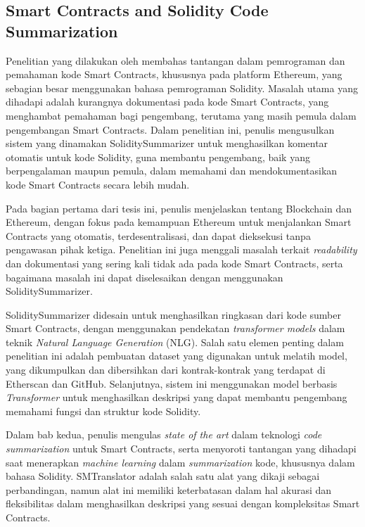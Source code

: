 \subsection{Smart Contracts and Solidity Code Summarization}
\label{subsec:smart-contract-solidity-summary}

Penelitian yang dilakukan oleh \cite{zhang2021smart} membahas tantangan dalam pemrograman dan pemahaman kode Smart Contracts, khususnya pada platform Ethereum, yang sebagian besar menggunakan bahasa pemrograman Solidity. Masalah utama yang dihadapi adalah kurangnya dokumentasi pada kode Smart Contracts, yang menghambat pemahaman bagi pengembang, terutama yang masih pemula dalam pengembangan Smart Contracts. Dalam penelitian ini, penulis mengusulkan sistem yang dinamakan SoliditySummarizer untuk menghasilkan komentar otomatis untuk kode Solidity, guna membantu pengembang, baik yang berpengalaman maupun pemula, dalam memahami dan mendokumentasikan kode Smart Contracts secara lebih mudah.

Pada bagian pertama dari tesis ini, penulis menjelaskan tentang Blockchain dan Ethereum, dengan fokus pada kemampuan Ethereum untuk menjalankan Smart Contracts yang otomatis, terdesentralisasi, dan dapat dieksekusi tanpa pengawasan pihak ketiga. Penelitian ini juga menggali masalah terkait \textit{readability} dan dokumentasi yang sering kali tidak ada pada kode Smart Contracts, serta bagaimana masalah ini dapat diselesaikan dengan menggunakan SoliditySummarizer.

SoliditySummarizer didesain untuk menghasilkan ringkasan dari kode sumber Smart Contracts, dengan menggunakan pendekatan \textit{transformer models} dalam teknik \textit{Natural Language Generation} (NLG). Salah satu elemen penting dalam penelitian ini adalah pembuatan dataset yang digunakan untuk melatih model, yang dikumpulkan dan dibersihkan dari kontrak-kontrak yang terdapat di Etherscan dan GitHub. Selanjutnya, sistem ini menggunakan model berbasis \textit{Transformer} untuk menghasilkan deskripsi yang dapat membantu pengembang memahami fungsi dan struktur kode Solidity.

Dalam bab kedua, penulis mengulas \textit{state of the art} dalam teknologi \textit{code summarization} untuk Smart Contracts, serta menyoroti tantangan yang dihadapi saat menerapkan \textit{machine learning} dalam \textit{summarization} kode, khususnya dalam bahasa Solidity. SMTranslator adalah salah satu alat yang dikaji sebagai perbandingan, namun alat ini memiliki keterbatasan dalam hal akurasi dan fleksibilitas dalam menghasilkan deskripsi yang sesuai dengan kompleksitas Smart Contracts.

